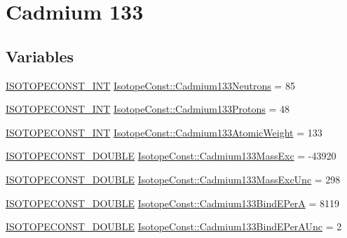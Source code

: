 \hypertarget{group___isotope_const-_cadmium-_cd133}{}\section{Cadmium 133}
\label{group___isotope_const-_cadmium-_cd133}
\subsection*{Variables}
\begin{DoxyCompactItemize}
\item 
\mbox{\hyperlink{group___isotope_const-_macros_ga5f18360b3e99483a35c32d789e62621c}{I\+S\+O\+T\+O\+P\+E\+C\+O\+N\+S\+T\+\_\+\+I\+NT}} \mbox{\hyperlink{group___isotope_const-_cadmium-_cd133_gad84911ee7277231e879e55fe45e34c93}{Isotope\+Const\+::\+Cadmium133\+Neutrons}} = 85
\item 
\mbox{\hyperlink{group___isotope_const-_macros_ga5f18360b3e99483a35c32d789e62621c}{I\+S\+O\+T\+O\+P\+E\+C\+O\+N\+S\+T\+\_\+\+I\+NT}} \mbox{\hyperlink{group___isotope_const-_cadmium-_cd133_gafab4e213291e679e93f83bdf75817143}{Isotope\+Const\+::\+Cadmium133\+Protons}} = 48
\item 
\mbox{\hyperlink{group___isotope_const-_macros_ga5f18360b3e99483a35c32d789e62621c}{I\+S\+O\+T\+O\+P\+E\+C\+O\+N\+S\+T\+\_\+\+I\+NT}} \mbox{\hyperlink{group___isotope_const-_cadmium-_cd133_ga20dffeca6f205950e5bb6ac5de993aee}{Isotope\+Const\+::\+Cadmium133\+Atomic\+Weight}} = 133
\item 
\mbox{\hyperlink{group___isotope_const-_macros_ga8f45a7272ce02c0b4c65c44636ed719a}{I\+S\+O\+T\+O\+P\+E\+C\+O\+N\+S\+T\+\_\+\+D\+O\+U\+B\+LE}} \mbox{\hyperlink{group___isotope_const-_cadmium-_cd133_ga064bf6843131110ea6416f03f7fa89a3}{Isotope\+Const\+::\+Cadmium133\+Mass\+Exc}} = -\/43920
\item 
\mbox{\hyperlink{group___isotope_const-_macros_ga8f45a7272ce02c0b4c65c44636ed719a}{I\+S\+O\+T\+O\+P\+E\+C\+O\+N\+S\+T\+\_\+\+D\+O\+U\+B\+LE}} \mbox{\hyperlink{group___isotope_const-_cadmium-_cd133_gae3e4f3c066408fc65d4a31197b5d7591}{Isotope\+Const\+::\+Cadmium133\+Mass\+Exc\+Unc}} = 298
\item 
\mbox{\hyperlink{group___isotope_const-_macros_ga8f45a7272ce02c0b4c65c44636ed719a}{I\+S\+O\+T\+O\+P\+E\+C\+O\+N\+S\+T\+\_\+\+D\+O\+U\+B\+LE}} \mbox{\hyperlink{group___isotope_const-_cadmium-_cd133_gacd425d1cac416084d40f4ea83166d4f8}{Isotope\+Const\+::\+Cadmium133\+Bind\+E\+PerA}} = 8119
\item 
\mbox{\hyperlink{group___isotope_const-_macros_ga8f45a7272ce02c0b4c65c44636ed719a}{I\+S\+O\+T\+O\+P\+E\+C\+O\+N\+S\+T\+\_\+\+D\+O\+U\+B\+LE}} \mbox{\hyperlink{group___isotope_const-_cadmium-_cd133_ga159d4d916c8272333d41608ac99aab9c}{Isotope\+Const\+::\+Cadmium133\+Bind\+E\+Per\+A\+Unc}} = 2

\end{DoxyCompactItemize}
